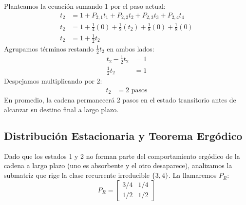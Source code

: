 \documentclass[12pt, a4paper]{article}
\begin{document}
Planteamos la ecuación sumando 1 por el paso actual:
\begin{align}
    t_2 &= 1 + P_{2,1}t_1 + P_{2,2}t_2 + P_{2,3}t_3 + P_{2,4}t_4 \\
    t_2 &= 1 + \frac{1}{4}(0) + \frac{1}{2}(t_2) + \frac{1}{8}(0) + \frac{1}{8}(0) \\
    t_2 &= 1 + \frac{1}{2}t_2
\end{align}
Agrupamos términos restando $\frac{1}{2}t_2$ en ambos lados:
\begin{align*}
    t_2 - \frac{1}{2}t_2 &= 1 \\
    \frac{1}{2}t_2 &= 1
\end{align*}
Despejamos multiplicando por 2:
\begin{align*}
    t_2 &= 2 \text{ pasos}
\end{align*}
En promedio, la cadena permanecerá 2 pasos en el estado transitorio antes de alcanzar su destino final a largo plazo.

\subsection{Distribución Estacionaria y Teorema Ergódico}
Dado que los estados 1 y 2 no forman parte del comportamiento ergódico de la cadena a largo plazo (uno es absorbente y el otro desaparece), analizamos la submatriz que rige la clase recurrente irreducible $\{3,4\}$. La llamaremos $P_R$:
$$ P_R = \begin{bmatrix} 3/4 & 1/4 \\ 1/2 & 1/2 \end{bmatrix} $$
\end{document}
